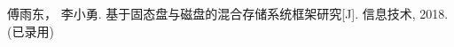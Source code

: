 
\begin{publications}{99}
    \item\textsc{傅雨东， 李小勇}. {基于固态盘与磁盘的混合存储系统框架研究}[J]. 信息技术, 2018.(已录用)
\end{publications}
